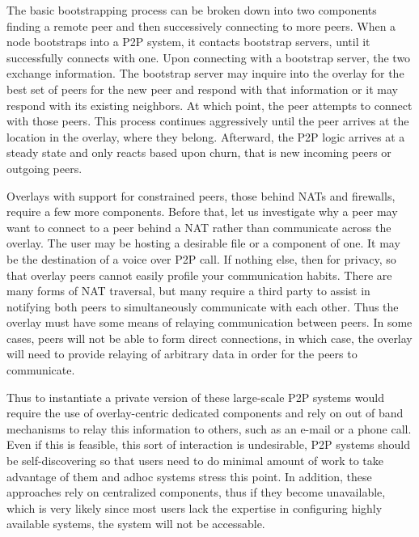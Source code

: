\documentclass[conference]{IEEEtran}
\begin{document}
The basic bootstrapping process can be broken down into two components finding a
remote peer and then successively connecting to more peers.  When a node
bootstraps into a P2P system, it contacts bootstrap servers, until it
successfully connects with one.  Upon connecting with a bootstrap server, the
two exchange information.  The bootstrap server may inquire into the overlay for
the best set of peers for the new peer and respond with that information or it
may respond with its existing neighbors.  At which point, the peer attempts to
connect with those peers.  This process continues aggressively until the peer
arrives at the location in the overlay, where they belong.  Afterward, the P2P
logic arrives at a steady state and only reacts based upon churn, that is new
incoming peers or outgoing peers.

Overlays with support for constrained peers, those behind NATs and firewalls,
require a few more components.  Before that, let us investigate why a peer may
want to connect to a peer behind a NAT rather than communicate across the
overlay.  The user may be hosting a desirable file or a component of one. It
may be the destination of a voice over P2P call.  If nothing else, then for
privacy, so that overlay peers cannot easily profile your communication habits.
There are many forms of NAT traversal, but many require a third party to assist
in notifying both peers to simultaneously communicate with each other.  Thus
the overlay must have some means of relaying communication between peers.  In
some cases, peers will not be able to form direct connections, in which case,
the overlay will need to provide relaying of arbitrary data in order for the
peers to communicate.

Thus to instantiate a private version of these large-scale P2P systems would
require the use of overlay-centric dedicated components and rely on out of band
mechanisms to relay this information to others, such as an e-mail or a phone
call.  Even if this is feasible, this sort of interaction is undesirable, P2P
systems should be self-discovering so that users need to do minimal amount of
work to take advantage of them and adhoc systems stress this point.  In
addition, these approaches rely on centralized components, thus if they become
unavailable, which is very likely since most users lack the expertise in
configuring highly available systems, the system will not be accessable.
\end{document}
